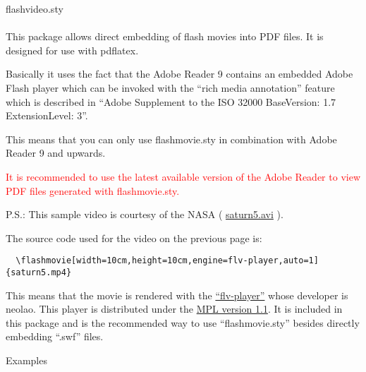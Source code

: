 \documentclass[10pt]{article}
\begin{document}
{\Huge flashvideo.sty}\\\\

This package allows direct embedding of flash movies into PDF files. It is
designed for use with pdflatex.



Basically it uses the fact that the Adobe Reader 9 contains an embedded Adobe Flash 
player which can be invoked with the ``rich media annotation'' feature which is described 
in ``Adobe Supplement to the ISO 32000 BaseVersion: 1.7 ExtensionLevel: 3''.

\vspace{0.5cm}

This means that you can only use flashmovie.sty in combination
with Adobe Reader 9 and upwards.

\vspace{0.5cm}

\textcolor{red}{
  It is recommended to use the latest available version of the Adobe Reader
  to view PDF files generated with flashmovie.sty.
}

\vspace{0.5cm}

P.S.: This sample video is courtesy of the NASA ( \href{http://heasarc.gsfc.nasa.gov/Videos/historical/saturn5.avi}{saturn5.avi} ).

\newpage

The source code used for the video on the previous page is:

\begin{verbatim}
  \flashmovie[width=10cm,height=10cm,engine=flv-player,auto=1]{saturn5.mp4}
\end{verbatim}

This means that the movie is rendered with the \href{http://flv-player.net}{``flv-player''}
whose developer is neolao. This player is distributed under the
\href{http://www.mozilla.org/MPL/}{MPL version 1.1}.
It is included in this package and is the recommended way to use ``flashmovie.sty''
besides directly embedding ``.swf'' files.

\vspace{1cm}

{\Huge Examples}\\\\
\end{document}
